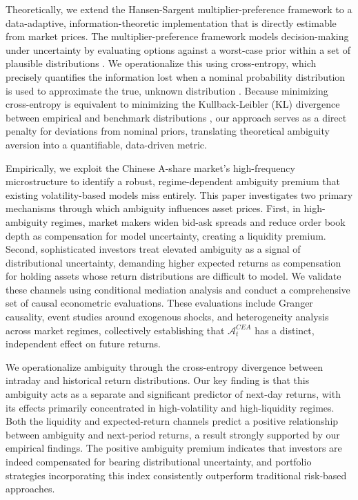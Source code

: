 \documentclass[preprint,12pt,authoryear]{elsarticle}
\renewcommand{\textcolor}[2]{\begingroup\color{#1}#2\endgroup}
\begin{document}
\textcolor{red}{Theoretically, we extend the Hansen-Sargent multiplier-preference framework \citep{hansen2001} to a data-adaptive, information-theoretic implementation that is directly estimable from market prices. The multiplier-preference framework models decision-making under uncertainty by evaluating options against a worst-case prior within a set of plausible distributions \citep{maccheroni2006, epstein2008}. We operationalize this using cross-entropy, which precisely quantifies the information lost when a nominal probability distribution is used to approximate the true, unknown distribution \citep{klibanoff2005}. Because minimizing cross-entropy is equivalent to minimizing the Kullback-Leibler (KL) divergence between empirical and benchmark distributions \citep{mackay2003information}, our approach serves as a direct penalty for deviations from nominal priors, translating theoretical ambiguity aversion into a quantifiable, data-driven metric.}

\textcolor{red}{Empirically, we exploit the Chinese A-share market's high-frequency microstructure to identify a robust, regime-dependent ambiguity premium that existing volatility-based models miss entirely. This paper investigates two primary mechanisms through which ambiguity influences asset prices. First, in high-ambiguity regimes, market makers widen bid-ask spreads and reduce order book depth as compensation for model uncertainty, creating a liquidity premium. Second, sophisticated investors treat elevated ambiguity as a signal of distributional uncertainty, demanding higher expected returns as compensation for holding assets whose return distributions are difficult to model. We validate these channels using conditional mediation analysis and conduct a comprehensive set of causal econometric evaluations. These evaluations include Granger causality, event studies around exogenous shocks, and heterogeneity analysis across market regimes, collectively establishing that $\mathcal{A}^{CEA}_t$ has a distinct, independent effect on future returns.}

\textcolor{red}{We operationalize ambiguity through the cross-entropy divergence between intraday and historical return distributions. Our key finding is that this ambiguity acts as a separate and significant predictor of next-day returns, with its effects primarily concentrated in high-volatility and high-liquidity regimes. Both the liquidity and expected-return channels predict a positive relationship between ambiguity and next-period returns, a result strongly supported by our empirical findings. The positive ambiguity premium indicates that investors are indeed compensated for bearing distributional uncertainty, and portfolio strategies incorporating this index consistently outperform traditional risk-based approaches.}
\end{document}

